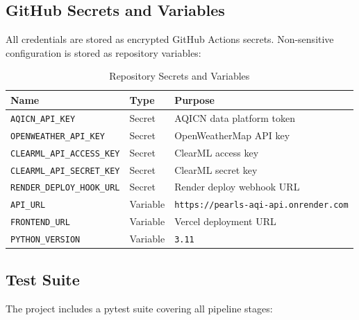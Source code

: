 \documentclass[12pt, a4paper, oneside]{article}
\begin{document}
\subsection{GitHub Secrets and Variables}

All credentials are stored as encrypted GitHub Actions secrets. Non-sensitive configuration is stored as repository variables:

\begin{table}[H]
\centering
\caption{Repository Secrets and Variables}
\label{tab:secrets}
\begin{tabular}{l l l}
\toprule
\textbf{Name} & \textbf{Type} & \textbf{Purpose} \\
\midrule
\texttt{AQICN\_API\_KEY} & Secret & AQICN data platform token \\
\texttt{OPENWEATHER\_API\_KEY} & Secret & OpenWeatherMap API key \\
\texttt{CLEARML\_API\_ACCESS\_KEY} & Secret & ClearML access key \\
\texttt{CLEARML\_API\_SECRET\_KEY} & Secret & ClearML secret key \\
\texttt{RENDER\_DEPLOY\_HOOK\_URL} & Secret & Render deploy webhook URL \\
\texttt{API\_URL} & Variable & \texttt{https://pearls-aqi-api.onrender.com} \\
\texttt{FRONTEND\_URL} & Variable & Vercel deployment URL \\
\texttt{PYTHON\_VERSION} & Variable & \texttt{3.11} \\
\bottomrule
\end{tabular}
\end{table}

\subsection{Test Suite}

The project includes a pytest suite covering all pipeline stages:
\end{document}
